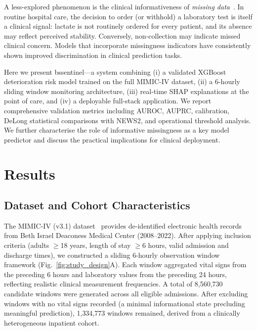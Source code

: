 \documentclass[12pt]{article}
\begin{document}
A less-explored phenomenon is the clinical informativeness of
\emph{missing data}~\cite{wells2013, sperrin2017}. In routine hospital care,
the decision to order (or withhold) a laboratory test is itself a clinical
signal: lactate is not routinely ordered for every patient, and its absence
may reflect perceived stability. Conversely, non-collection may indicate
missed clinical concern. Models that incorporate missingness indicators have
consistently shown improved discrimination in clinical prediction tasks.

Here we present bssentinel---a system combining (i) a validated XGBoost
deterioration risk model trained on the full MIMIC-IV dataset, (ii) a
6-hourly sliding window monitoring architecture, (iii) real-time SHAP
explanations at the point of care, and (iv) a deployable full-stack
application. We report comprehensive validation metrics including AUROC,
AUPRC, calibration, DeLong statistical comparisons with NEWS2, and operational
threshold analysis. We further characterise the role of informative missingness
as a key model predictor and discuss the practical implications for clinical
deployment.

\section*{Results}

\subsection*{Dataset and Cohort Characteristics}

The MIMIC-IV (v3.1) dataset~\cite{johnson2023_mimic} provides de-identified
electronic health records from Beth Israel Deaconess Medical Center (2008--2022).
After applying inclusion criteria (adults $\geq$18 years, length of stay
$\geq$6 hours, valid admission and discharge times), we constructed a sliding
6-hourly observation window framework (Fig.~\ref{fig:study_design}A). Each
window aggregated vital signs from the preceding 6 hours and laboratory values
from the preceding 24 hours, reflecting realistic clinical measurement
frequencies. A total of 8{,}560{,}730 candidate windows were generated across
all eligible admissions. After excluding windows with no vital signs recorded
(a minimal informational state precluding meaningful prediction), 1{,}334{,}773
windows remained, derived from a clinically heterogeneous inpatient cohort.
\end{document}
